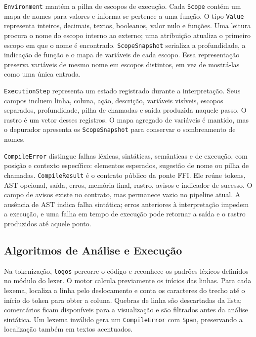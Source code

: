 \documentclass[
    12pt
    ,oneside
    ,a4paper
    ,chapter=TITLE
    ,section=TITLE
    ,sumario=abnt-6027-2012]{abntex2}
\begin{document}
\texttt{Environment} mantém a pilha de escopos de execução. Cada \texttt{Scope}
contém um mapa de nomes para valores e informa se pertence a uma função. O tipo
\texttt{Value} representa inteiros, decimais, textos, booleanos, valor nulo e funções.
Uma leitura procura o nome do escopo interno ao externo; uma atribuição atualiza o primeiro
escopo em que o nome é encontrado. \texttt{ScopeSnapshot} serializa a profundidade,
a indicação de função e o mapa de variáveis de cada escopo. Essa representação preserva
variáveis de mesmo nome em escopos distintos, em vez de mostrá-las como uma única entrada.

\texttt{ExecutionStep} representa um estado registrado durante a interpretação. Seus
campos incluem linha, coluna, ação, descrição, variáveis visíveis, escopos separados,
profundidade, pilha de chamadas e saída produzida naquele passo. O rastro é um vetor desses
registros. O mapa agregado de variáveis é mantido, mas o depurador apresenta os
\texttt{ScopeSnapshot} para conservar o sombreamento de nomes.

\texttt{CompileError} distingue falhas léxicas, sintáticas, semânticas e de execução,
com posição e contexto específico: elementos esperados, sugestão de nome ou pilha de
chamadas. \texttt{CompileResult} é o contrato público da ponte FFI. Ele reúne tokens,
AST opcional, saída, erros, memória final, rastro, avisos e indicador de sucesso.
O campo de avisos existe no contrato, mas permanece vazio no pipeline atual. A ausência
de AST indica falha sintática; erros anteriores à interpretação impedem a execução, e
uma falha em tempo de execução pode retornar a saída e o rastro produzidos até aquele ponto.

\subsection{Algoritmos de Análise e Execução}
\label{sec:algoritmos_implementacao}

Na tokenização, \texttt{logos} percorre o código e reconhece os padrões léxicos definidos
no módulo do lexer. O motor calcula previamente os inícios das linhas. Para cada lexema,
localiza a linha pelo deslocamento e conta os caracteres do trecho até o início do token
para obter a coluna. Quebras de linha são descartadas da lista; comentários ficam disponíveis
para a visualização e são filtrados antes da análise sintática. Um lexema inválido gera um
\texttt{CompileError} com \texttt{Span}, preservando a localização também em textos acentuados.
\end{document}
